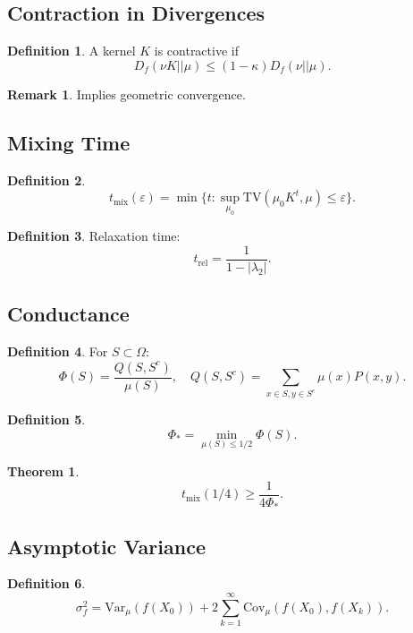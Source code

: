 \documentclass[12pt,oneside]{book}
\numberwithin{equation}{section}
\theoremstyle{definition}
\newtheorem{definition}{Definition}[section]
\newtheorem{remark}{Remark}[section]
\theoremstyle{plain}
\newtheorem{theorem}{Theorem}[section]
\theoremstyle{remark}
\newcommand{\Var}{\mathrm{Var}}
\begin{document}
\subsection{Contraction in Divergences}

\begin{definition}
A kernel $K$ is contractive if
\[
D_f(\nu K || \mu) \le (1-\kappa) D_f(\nu || \mu).
\]
\end{definition}

\begin{remark}
Implies geometric convergence.
\end{remark}


\subsection{Mixing Time}

\begin{definition}
\[
t_{\mathrm{mix}}(\varepsilon)
=
\min\{t : \sup_{\mu_0} \mathrm{TV}(\mu_0 K^t, \mu) \le \varepsilon\}.
\]
\end{definition}

\begin{definition}
Relaxation time:
\[
t_{\mathrm{rel}} = \frac{1}{1-|\lambda_2|}.
\]
\end{definition}


\subsection{Conductance}

\begin{definition}
For $S \subset \Omega$:
\[
\Phi(S) = \frac{Q(S,S^c)}{\mu(S)},
\quad
Q(S,S^c) = \sum_{x \in S, y \in S^c} \mu(x)P(x,y).
\]
\end{definition}

\begin{definition}
\[
\Phi_* = \min_{\mu(S)\le 1/2} \Phi(S).
\]
\end{definition}

\begin{theorem}
\[
t_{\mathrm{mix}}(1/4) \ge \frac{1}{4\Phi_*}.
\]
\end{theorem}


\subsection{Asymptotic Variance}

\begin{definition}
\[
\sigma_f^2
=
\Var_\mu(f(X_0)) + 2\sum_{k=1}^\infty \mathrm{Cov}_\mu(f(X_0), f(X_k)).
\]
\end{definition}
\end{document}
